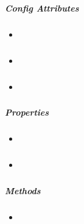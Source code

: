 \documentclass[letterpaper,10pt,english]{sphinxmanual}
\begin{document}
\subparagraph{Config Attributes}
\label{api/component/dd/draggable-delegate:config-attributes}\begin{itemize}
\item {}
{\hyperref[api/component/dd/draggable-delegate:DraggableDelegate.container]{}}

\item {}
{\hyperref[api/component/dd/draggable-delegate:DraggableDelegate.selector]{}}

\item {}
{\hyperref[api/component/dd/draggable-delegate:DraggableDelegate.handlers]{}}

\end{itemize}


\subparagraph{Properties}
\label{api/component/dd/draggable-delegate:properties}\begin{itemize}
\item {}
{\hyperref[api/component/dd/draggable-delegate:DraggableDelegate.node]{}}

\item {}
{\hyperref[api/component/dd/draggable-delegate:DraggableDelegate.dragNode]{}}

\end{itemize}


\subparagraph{Methods}
\label{api/component/dd/draggable-delegate:methods}\begin{itemize}
\item {}
{\hyperref[api/component/dd/draggable-delegate:DraggableDelegate.destroy]{}}

\end{itemize}
\end{document}
